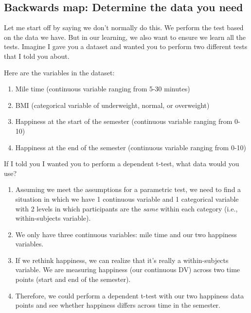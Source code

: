\documentclass[
]{book}
\providecommand{\tightlist}{%
  \setlength{\itemsep}{0pt}\setlength{\parskip}{0pt}}
\begin{document}
\hypertarget{backwards-map-determine-the-data-you-need}{%
\subsection{Backwards map: Determine the data you need}\label{backwards-map-determine-the-data-you-need}}

Let me start off by saying we don't normally do this. We perform the test based on the data we have. But in our learning, we also want to ensure we learn all the tests. Imagine I gave you a dataset and wanted you to perform two different tests that I told you about.

Here are the variables in the dataset:

\begin{enumerate}
\def\labelenumi{\arabic{enumi}.}
\tightlist
\item
  Mile time (continuous variable ranging from 5-30 minutes)
\item
  BMI (categorical variable of underweight, normal, or overweight)
\item
  Happiness at the start of the semester (continuous variable ranging from 0-10)
\item
  Happiness at the end of the semester (continuous variable ranging from 0-10)
\end{enumerate}

If I told you I wanted you to perform a dependent t-test, what data would you use?

\begin{enumerate}
\def\labelenumi{\arabic{enumi}.}
\tightlist
\item
  Assuming we meet the assumptions for a parametric test, we need to find a situation in which we have 1 continuous variable and 1 categorical variable with 2 levels in which participants are the \emph{same} within each category (i.e., within-subjects variable).
\item
  We only have three continuous variables: mile time and our two happiness variables.
\item
  If we rethink happiness, we can realize that it's really a within-subjects variable. We are measuring happiness (our continuous DV) across two time points (start and end of the semester).
\item
  Therefore, we could perform a dependent t-test with our two happiness data points and see whether happiness differs across time in the semester.
\end{enumerate}
\end{document}
